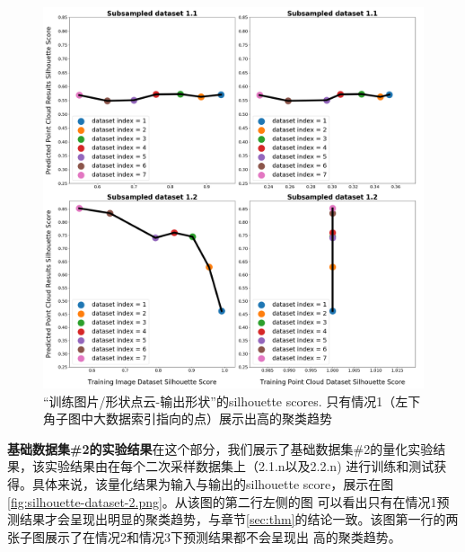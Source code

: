 \documentclass[bachelor, nocolorlinks, printoneside]{seuthesis} %
\begin{document}
\begin{Main}
\begin{figure}[h!]
    \centering
    \includegraphics[width=.95\textwidth]{figs/silhouette-dataset-1.png}
    \caption{\small “训练图片/形状点云-输出形状”的silhouette scores. 只有情况1（左下角子图中大数据索引指向的点）展示出高的聚类趋势}
    \label{fig:silhouette-dataset-1.png}
\end{figure}
\FloatBarrier
\textbf{基础数据集\#2的实验结果}在这个部分，我们展示了基础数据集\#2的量化实验结果，该实验结果由在每个二次采样数据集上（2.1.n以及2.2.n)
进行训练和测试获得。具体来说，该量化结果为输入与输出的silhouette score，展示在图\ref{fig:silhouette-dataset-2.png}。从该图的第二行左侧的图
可以看出只有在情况1预测结果才会呈现出明显的聚类趋势，与章节\ref{sec:thm}的结论一致。该图第一行的两张子图展示了在情况2和情况3下预测结果都不会呈现出
高的聚类趋势。


\end{Main}
\end{document}
